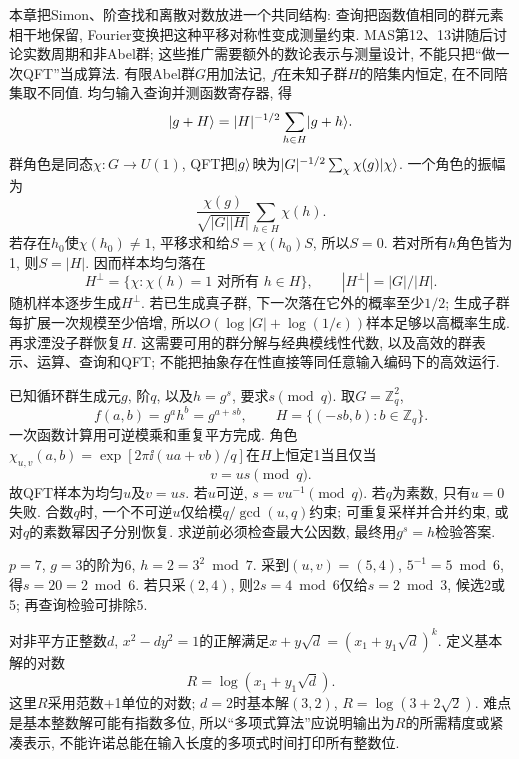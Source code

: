 本章把Simon、阶查找和离散对数放进一个共同结构: 查询把函数值相同的群元素相干地保留, Fourier变换把这种平移对称性变成测量约束. MAS第12、13讲随后讨论实数周期和非Abel群; 这些推广需要额外的数论表示与测量设计, 不能只把“做一次QFT”当成算法.
有限Abel群$G$用加法记, $f$在未知子群$H$的陪集内恒定, 在不同陪集取不同值. 均匀输入查询并测函数寄存器, 得
\[\lvert g+H\rangle=|H|^{-1/2}\sum_{h\in H}\lvert g+h\rangle.\]
群角色是同态$\chi:G\to U(1)$, QFT把$\lvert g\rangle$映为$|G|^{-1/2}\sum_\chi\chi(g)\lvert \chi\rangle$. 一个角色的振幅为
\[\frac{\chi(g)}{\sqrt{|G||H|}}\sum_{h\in H}\chi(h).\]
若存在$h_0$使$\chi(h_0)\ne1$, 平移求和给$S=\chi(h_0)S$, 所以$S=0$. 若对所有$h$角色皆为1, 则$S=|H|$. 因而样本均匀落在
\[H^\perp=\{\chi:\chi(h)=1\text{ 对所有 }h\in H\},\qquad
 |H^\perp|=|G|/|H|.\]
随机样本逐步生成$H^\perp$. 若已生成真子群, 下一次落在它外的概率至少$1/2$; 生成子群每扩展一次规模至少倍增, 所以$O(\log|G|+\log(1/\epsilon))$样本足够以高概率生成. 再求湮没子群恢复$H$. 这需要可用的群分解与经典模线性代数, 以及高效的群表示、运算、查询和QFT; 不能把抽象存在性直接等同任意输入编码下的高效运行.

已知循环群生成元$g$, 阶$q$, 以及$h=g^s$, 要求$s\pmod q$. 取$G=\mathbb Z_q^2$,
\[f(a,b)=g^a h^b=g^{a+sb},\qquad
 H=\{(-sb,b):b\in\mathbb Z_q\}.\]
一次函数计算用可逆模乘和重复平方完成. 角色$\chi_{u,v}(a,b)=\exp[2\pi\ii(ua+vb)/q]$在$H$上恒定1当且仅当
\[v=us\pmod q.\]
故QFT样本为均匀$u$及$v=us$. 若$u$可逆, $s=v u^{-1}\pmod q$. 若$q$为素数, 只有$u=0$失败. 合数$q$时, 一个不可逆$u$仅给模$q/\gcd(u,q)$约束; 可重复采样并合并约束, 或对$q$的素数幂因子分别恢复. 求逆前必须检查最大公因数, 最终用$g^s=h$检验答案.
\begin{example}$p=7$, $g=3$的阶为6, $h=2=3^2\bmod7$. 采到$(u,v)=(5,4)$, $5^{-1}=5\bmod6$, 得$s=20=2\bmod6$. 若只采$(2,4)$, 则$2s=4\bmod6$仅给$s=2\bmod3$, 候选2或5; 再查询检验可排除5.\end{example}

对非平方正整数$d$, $x^2-dy^2=1$的正解满足$x+y\sqrt d=(x_1+y_1\sqrt d)^k$. 定义基本解的对数
\[R=\log(x_1+y_1\sqrt d).\]
这里$R$采用范数+1单位的对数; $d=2$时基本解$(3,2)$, $R=\log(3+2\sqrt2)$. 难点是基本整数解可能有指数多位, 所以“多项式算法”应说明输出为$R$的所需精度或紧凑表示, 不能许诺总能在输入长度的多项式时间打印所有整数位.

